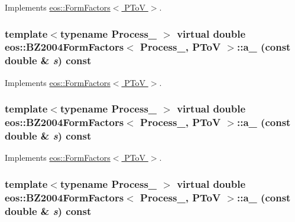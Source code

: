 Implements \hyperlink{classeos_1_1FormFactors_3_01PToV_01_4_ac1f21721a19b71abb3e3a433793db159}{eos::FormFactors$<$ PToV $>$}.\hypertarget{classeos_1_1BZ2004FormFactors_3_01Process___00_01PToV_01_4_a790c3bda390cd45e32f9d99daf3d87e0}{
\subsubsection[{a\_\-1}]{\setlength{\rightskip}{0pt plus 5cm}template$<$typename Process\_\- $>$ virtual double eos::BZ2004FormFactors$<$ Process\_\-, {\bf PToV} $>$::a\_ (const double \& {\em s}) const}}
\label{classeos_1_1BZ2004FormFactors_3_01Process___00_01PToV_01_4_a790c3bda390cd45e32f9d99daf3d87e0}


Implements \hyperlink{classeos_1_1FormFactors_3_01PToV_01_4_a0d6fdeca880da81163bbcdca7057bdcb}{eos::FormFactors$<$ PToV $>$}.\hypertarget{classeos_1_1BZ2004FormFactors_3_01Process___00_01PToV_01_4_a2a5dd7b8b48e71efd26489622a10ed7f}{
\subsubsection[{a\_\-12}]{\setlength{\rightskip}{0pt plus 5cm}template$<$typename Process\_\- $>$ virtual double eos::BZ2004FormFactors$<$ Process\_\-, {\bf PToV} $>$::a\_ (const double \& {\em s}) const}}
\label{classeos_1_1BZ2004FormFactors_3_01Process___00_01PToV_01_4_a2a5dd7b8b48e71efd26489622a10ed7f}


Implements \hyperlink{classeos_1_1FormFactors_3_01PToV_01_4_aba4400dbd92741ee82eb759c62a28fa9}{eos::FormFactors$<$ PToV $>$}.\hypertarget{classeos_1_1BZ2004FormFactors_3_01Process___00_01PToV_01_4_a772daa575ec65cac187fc0ec34364ddd}{
\subsubsection[{a\_\-2}]{\setlength{\rightskip}{0pt plus 5cm}template$<$typename Process\_\- $>$ virtual double eos::BZ2004FormFactors$<$ Process\_\-, {\bf PToV} $>$::a\_ (const double \& {\em s}) const}}
\label{classeos_1_1BZ2004FormFactors_3_01Process___00_01PToV_01_4_a772daa575ec65cac187fc0ec34364ddd}


